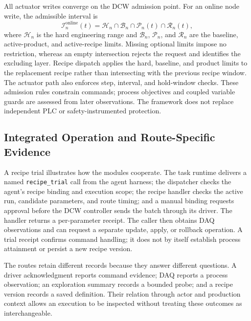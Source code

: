 All actuator writes converge on the DCW admission point. For an online node
write, the admissible interval is
\begin{equation}
\mathcal{I}^{\mathrm{online}}_n(t)=\mathcal{H}_n\cap\mathcal{B}_n
\cap\mathcal{P}_n(t)\cap\mathcal{R}_n(t),
\label{eq:admission}
\end{equation}
where $\mathcal{H}_n$ is the hard engineering range and $\mathcal{B}_n$,
$\mathcal{P}_n$, and $\mathcal{R}_n$ are the baseline, active-product, and
active-recipe limits. Missing optional limits impose no restriction, whereas
an empty intersection rejects the request and identifies the excluding
layer. Recipe dispatch applies the hard, baseline, and product limits to the
replacement recipe rather than intersecting with the previous recipe window.
The actuator path also enforces step, interval, and hold-window checks.
These admission rules constrain commands; process objectives and coupled
variable guards are assessed from later observations. The framework does
not replace independent PLC or safety-instrumented protection.

\subsection{Integrated Operation and Route-Specific Evidence}
\label{sec:tasklifecycle}
A recipe trial illustrates how the modules cooperate. The task runtime
delivers a named \texttt{recipe\_trial} call from the agent harness; the
dispatcher checks the agent's recipe binding and execution scope; the recipe
handler checks the active run, candidate parameters, and route timing; and a
manual binding requests approval before the DCW controller sends the batch
through its driver. The handler returns a per-parameter receipt. The caller
then obtains DAQ observations and can request a separate update, apply, or
rollback operation. A trial receipt confirms command handling; it does not
by itself establish process attainment or persist a new recipe version.

The routes retain different records because they answer different
questions. A driver acknowledgment reports command evidence; DAQ reports a
process observation; an exploration summary records a bounded probe; and a
recipe version records a saved definition. Their relation through actor and
production context allows an execution to be inspected without treating
these outcomes as interchangeable.



